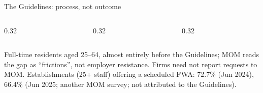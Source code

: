\begin{frame}[t,label=B-guidelines]{The Guidelines: process, not outcome}
  \begin{columns}[T,onlytextwidth]
    \begin{column}{0.32\textwidth}
    \end{column}
    \begin{column}{0.32\textwidth}
    \end{column}
    \begin{column}{0.32\textwidth}
    \end{column}
  \end{columns}
  \vspace{0.06cm}
  {\fontsize{8.5}{10.2}\selectfont\RaggedRight Full-time residents aged 25--64, almost entirely before the Guidelines; MOM reads the gap as ``frictions'', not employer resistance. Firms need not report requests to MOM. Establishments (25+ staff) offering a scheduled FWA: 72.7\% (Jun 2024), 66.4\% (Jun 2025; another MOM survey; not attributed to the Guidelines).\par}
\end{frame}

